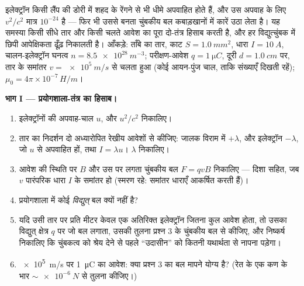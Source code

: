 \begin{problem}[{सप्ताहांत समस्या --- $10^{-24}$ का असंतुलन हर मोटर
कैसे चलाता है}]\label{pb:b3:covariant-electromagnetism:1}
इलेक्ट्रॉन किसी लैंप की डोरी में शहद के रेंगने से भी धीमे अपवाहित होते
हैं, और उस अपवाह के लिए $v^2/c^2$ मात्र $10^{-24}$ है --- फिर भी उससे
बनता चुंबकीय बल कबाड़खानों में कारें उठा लेता है। यह समस्या किसी सीधे
तार और किसी चलते आवेश का पूरा दो-तंत्र हिसाब करती है, और हर
विद्युत्चुंबक में छिपी आपेक्षिकता ढूँढ़ निकालती है। आँकड़े: ताँबे का
तार, काट $S = \qty{1.0}{mm^2}$, धारा $I = \qty{10}{A}$,
चालन-इलेक्ट्रॉन घनत्व $n = \qty{8.5e28}{m^{-3}}$; परीक्षण-आवेश
$q = \qty{1}{\micro C}$, दूरी $d = \qty{1.0}{cm}$ पर, तार के समांतर
$v = \qty{e5}{m/s}$ से चलता हुआ (कोई आयन-पुंज चाल, ताकि संख्याएँ दिखती
रहें); $\mu_0 = 4\pi\times10^{-7}\,\unit{H/m}$।

\medskip\noindent\textbf{भाग I --- प्रयोगशाला-तंत्र का हिसाब।}
\begin{enumerate}
  \item इलेक्ट्रॉनों की अपवाह-चाल $u$, और $u^2/c^2$ निकालिए।
  \item तार का निदर्शन दो अध्यारोपित रेखीय आवेशों से कीजिए: जालक
        विराम में $+\lambda$, और इलेक्ट्रॉन $-\lambda$, जो
        $u$ से अपवाहित हों, तथा $I = \lambda u$। $\lambda$ निकालिए।
  \item आवेश की स्थिति पर $B$ और उस पर लगता चुंबकीय बल
        $F = qvB$ निकालिए --- दिशा सहित, जब $v$ पारंपरिक धारा
        $I$ के समांतर हो (स्मरण रहे: समांतर धाराएँ आकर्षित करती हैं)।
  \item प्रयोगशाला में कोई \emph{विद्युत्} बल क्यों नहीं है?
  \item यदि उसी तार पर प्रति मीटर केवल एक अतिरिक्त इलेक्ट्रॉन जितना
        कुल आवेश होता, तो उसका विद्युत् क्षेत्र $q$ पर जो बल लगाता,
        उसकी तुलना प्रश्न 3 के चुंबकीय बल से कीजिए,
        और निष्कर्ष निकालिए कि चुंबकत्व को श्रेय देने से पहले
        ``उदासीन'' को कितनी यथार्थता से नापना पड़ेगा।
  \item \qty{e5}{m/s} पर \qty{1}{\micro C} का आवेश: क्या प्रश्न 3 का
        बल मापने योग्य है? (रेत के एक कण के भार
        $\sim\qty{e-6}{N}$ से तुलना कीजिए।)
\end{enumerate}


\end{problem}
